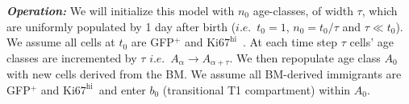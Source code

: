 \documentclass[11pt]{article}
\newcommand{\khi}{\ensuremath{\text{Ki67}^\text{hi}}~}
\newcommand\ie{$\textit{i.e.}$}
\begin{document}
\textbf{\textit{Operation:}}
We will initialize this model with $n_0$ age-classes, of width $\tau$, which are uniformly populated by 1 day after birth (\ie~$t_0=1$, $ n_0= t_\text{0}/{\tau}$ and $\tau \ll t_{0}$). We assume all cells at $t_{0}$ are GFP$^{+}$ and {\khi}.
At each time step $\tau$ cells' age classes are incremented by $\tau$ \ie~$A_\alpha \rightarrow A_{\alpha+\tau}$.
We then repopulate age class $A_0$ with new cells derived from the BM. We assume all BM-derived immigrants are GFP$^{+}$ and \khi and enter $b_0$ (transitional T1 compartment) within $A_{0}$. 

\end{document}
